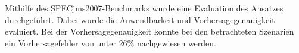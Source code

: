 Mithilfe des SPECjms2007-Benchmarks wurde eine Evaluation des Ansatzes durchgeführt. Dabei wurde die Anwendbarkeit und Vorhersagegenauigkeit evaluiert. Bei der Vorhersagegenauigkeit konnte bei den betrachteten Szenarien ein Vorhersagefehler von unter 26\% nachgewiesen werden.